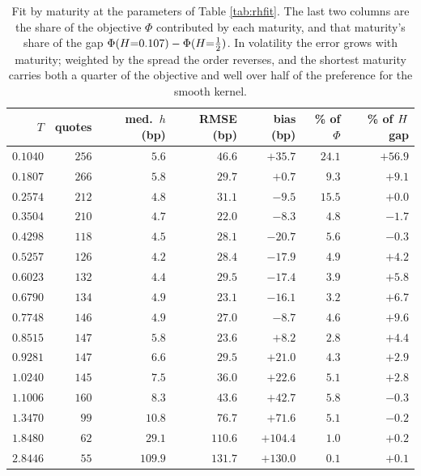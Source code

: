 \begin{table}[H]
\centering
\small
\begin{tabular}{rrrrrrr}
\hline
$T$ & quotes & med.\ $h$ (bp) & RMSE (bp) & bias (bp) & \% of $\Phi$ & \% of $H$ gap\\
\hline
$0.1040$ & $256$ & $5.6$ & $46.6$ & $+35.7$ & $\mathbf{24.1}$ & $\mathbf{+56.9}$\\
$0.1807$ & $266$ & $5.8$ & $29.7$ & $+0.7$ & $9.3$ & $+9.1$\\
$0.2574$ & $212$ & $4.8$ & $31.1$ & $-9.5$ & $15.5$ & $+0.0$\\
$0.3504$ & $210$ & $4.7$ & $22.0$ & $-8.3$ & $4.8$ & $-1.7$\\
$0.4298$ & $118$ & $4.5$ & $28.1$ & $-20.7$ & $5.6$ & $-0.3$\\
$0.5257$ & $126$ & $4.2$ & $28.4$ & $-17.9$ & $4.9$ & $+4.2$\\
$0.6023$ & $132$ & $4.4$ & $29.5$ & $-17.4$ & $3.9$ & $+5.8$\\
$0.6790$ & $134$ & $4.9$ & $23.1$ & $-16.1$ & $3.2$ & $+6.7$\\
$0.7748$ & $146$ & $4.9$ & $27.0$ & $-8.7$ & $4.6$ & $+9.6$\\
$0.8515$ & $147$ & $5.8$ & $23.6$ & $+8.2$ & $2.8$ & $+4.4$\\
$0.9281$ & $147$ & $6.6$ & $29.5$ & $+21.0$ & $4.3$ & $+2.9$\\
$1.0240$ & $145$ & $7.5$ & $36.0$ & $+22.6$ & $5.1$ & $+2.8$\\
$1.1006$ & $160$ & $8.3$ & $43.6$ & $+42.7$ & $5.8$ & $-0.3$\\
$1.3470$ & $\;\;99$ & $10.8$ & $76.7$ & $+71.6$ & $5.1$ & $-0.2$\\
$1.8480$ & $\;\;62$ & $29.1$ & $110.6$ & $+104.4$ & $1.0$ & $+0.2$\\
$2.8446$ & $\;\;55$ & $109.9$ & $131.7$ & $+130.0$ & $0.1$ & $+0.1$\\
\hline
\end{tabular}
\caption[Fit by maturity]{Fit by maturity at the parameters of Table \ref{tab:rhfit}. The last two columns are the
share of the objective $\Phi$ contributed by each maturity, and that maturity's share of the gap
$\Phi(H{=}0.107)-\Phi(H{=}\tfrac12)$. In volatility the error grows with maturity; weighted by
the spread the order reverses, and the shortest maturity carries both a quarter of the objective and
well over half of the preference for the smooth kernel.}
\label{tab:rhpermat}
\end{table}


